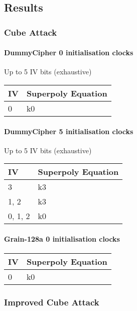 \documentclass{report}
\let\Oldsubsection\subsection
\renewcommand{\subsection}{\FloatBarrier\Oldsubsection}
\let\Oldsubsubsection\subsubsection
\renewcommand{\subsubsection}{\FloatBarrier\Oldsubsubsection}
\begin{document}
\begin{appendices}
\chapter{Results}
\subsection{Cube Attack}
\subsubsection{DummyCipher 0 initialisation clocks}
Up to 5 IV bits (exhaustive)
\begin{center}
    \begin{tabular}{| l | l |}
    \hline
    IV & Superpoly Equation\\ \hline
    {0} & k0\\ \hline
    \end{tabular}
\end{center}
\subsubsection{DummyCipher 5 initialisation clocks}
Up to 5 IV bits (exhaustive)
\begin{center}
    \begin{tabular}{| l | l |}
    \hline
    IV & Superpoly Equation\\ \hline
    {3} & k3\\ \hline
    {1, 2} & k3\\ \hline
    {0, 1, 2} & k0\\ \hline
    \end{tabular}
\end{center}
\subsubsection{Grain-128a 0 initialisation clocks}
\begin{center}
    \begin{tabular}{| l | l |}
    \hline
    IV & Superpoly Equation\\ \hline
    {0} & k0\\ \hline
    \end{tabular}
\end{center}

\subsection{Improved Cube Attack}
\end{appendices}
\end{document}
